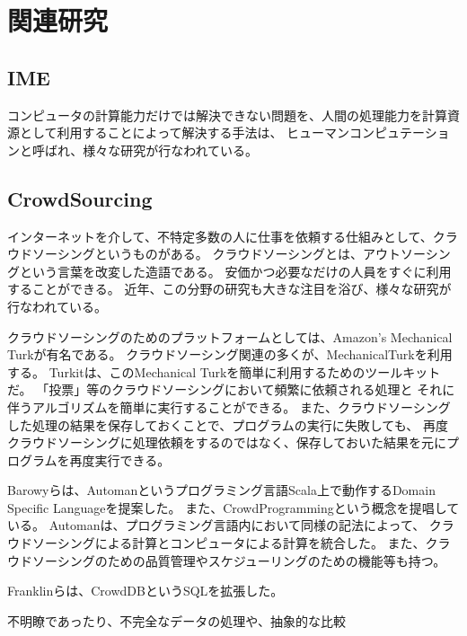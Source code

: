\chapter{関連研究}
\label{chap:related}

\section{IME}
コンピュータの計算能力だけでは解決できない問題を、人間の処理能力を計算資源として利用することによって解決する手法は、
ヒューマンコンピュテーション\cite{humancomputation}と呼ばれ、様々な研究が行なわれている。

\cite{recaptcha}
\cite{vizwiz}

\section{CrowdSourcing}
インターネットを介して、不特定多数の人に仕事を依頼する仕組みとして、クラウドソーシングというものがある。
クラウドソーシングとは、アウトソーシングという言葉を改変した造語である\cite{riseofcrowdsourcing}。
安価かつ必要なだけの人員をすぐに利用することができる。
近年、この分野の研究も大きな注目を浴び、様々な研究が行なわれている。

クラウドソーシングのためのプラットフォームとしては、Amazon's Mechanical Turkが有名である\cite{amt}。
クラウドソーシング関連の多くが、MechanicalTurkを利用する。
Turkit\cite{turkit}は、このMechanical Turkを簡単に利用するためのツールキットだ。
「投票」等のクラウドソーシングにおいて頻繁に依頼される処理と
それに伴うアルゴリズムを簡単に実行することができる。
また、クラウドソーシングした処理の結果を保存しておくことで、プログラムの実行に失敗しても、
再度クラウドソーシングに処理依頼をするのではなく、保存しておいた結果を元にプログラムを再度実行できる。

Barowyらは、Automanというプログラミング言語Scala上で動作するDomain Specific Languageを提案した\cite{automan}。
また、CrowdProgrammingという概念を提唱している。
Automanは、プログラミング言語内において同様の記法によって、
クラウドソーシングによる計算とコンピュータによる計算を統合した。
また、クラウドソーシングのための品質管理やスケジューリングのための機能等も持つ。

Franklinらは、CrowdDBというSQLを拡張した。

不明瞭であったり、不完全なデータの処理や、抽象的な比較
\cite{crowddb}

\cite{cylog}
\cite{crowdforge}
\cite{community-based-crowdsourcing}
\cite{soylent}

